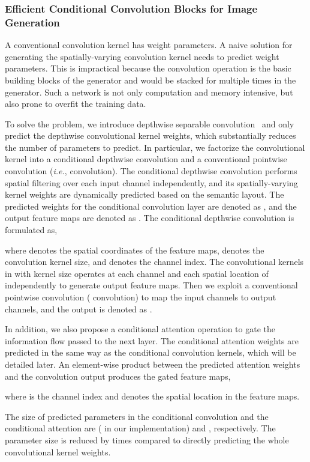 \documentclass{article}
\newcommand{\ie}{\textit{i.e.}}
\begin{document}
\subsubsection{Efficient Conditional Convolution Blocks for Image Generation}
A conventional convolution kernel has  weight parameters. A naive solution for generating the spatially-varying convolution kernel needs to predict  weight parameters.
This is impractical because the convolution operation is the basic building blocks of the generator  and would be stacked for multiple times in the generator. 
Such a network is not only computation and memory intensive, but also prone to overfit the training data.

To solve the problem, we introduce depthwise separable convolution~\cite{chollet2017xception} and only predict the depthwise convolutional kernel weights, which substantially reduces the number of parameters to predict.
In particular, we factorize the convolutional kernel into a conditional depthwise convolution and a conventional pointwise convolution (\ie,  convolution).
The conditional depthwise convolution performs spatial filtering over each input channel independently, and its spatially-varying kernel weights are dynamically predicted based on the semantic layout.
The predicted weights for the conditional convolution layer are denoted as , and the output feature maps are denoted as .
The conditional depthwise convolution is formulated as,

where  denotes the spatial coordinates of the feature maps,  denotes the convolution kernel size, and  denotes the channel index. 
The  convolutional kernels in  with kernel size  operates at each channel and each spatial location of  independently to generate output feature maps.
Then we exploit a conventional pointwise convolution ( convolution) to map the  input channels to  output channels, and the output is denoted as .

In addition, we also propose a conditional attention operation to gate the information flow passed to the next layer.
The conditional attention weights are predicted in the same way as the conditional convolution kernels, which will be detailed later.
An element-wise product between the predicted attention weights  and the convolution output  produces the gated feature maps,

where  is the channel index and  denotes the spatial location in the feature maps.

The size of predicted parameters in the conditional convolution and the conditional attention are  ( in our implementation) and , respectively.
The parameter size is reduced by  times compared to directly predicting the whole convolutional kernel weights.
\end{document}

